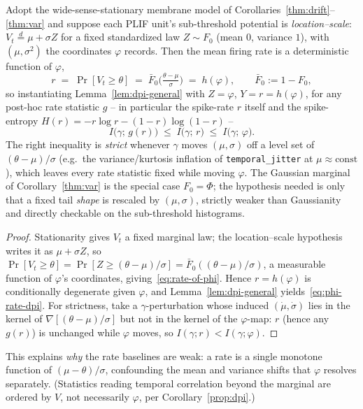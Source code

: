 ﻿\documentclass{article} %
\theoremstyle{remark}
\begin{document}
\begin{corollary}
\label{cor:rate-dpi}
Adopt the wide-sense-stationary membrane model of Corollaries~\ref{thm:drift}--\ref{thm:var} and
suppose each PLIF unit's sub-threshold potential is \emph{location--scale}:
$V_t\overset{d}{=}\mu+\sigma Z$ for a fixed standardized law $Z\sim F_0$ (mean $0$, variance $1$),
with $(\mu,\sigma^2)$ the coordinates $\varphi$ records. Then the mean firing rate is a deterministic
function of $\varphi$,
\begin{equation}
  r \;=\; \Pr[V_t\ge\theta] \;=\; \bar F_0\!\Big(\tfrac{\theta-\mu}{\sigma}\Big)\;=\;h(\varphi),
  \qquad \bar F_0:=1-F_0,
  \label{eq:rate-of-phi}
\end{equation}
so instantiating Lemma~\ref{lem:dpi-general} with $Z=\varphi$, $Y=r=h(\varphi)$, for any post-hoc
rate statistic $g$ -- in particular the spike-rate $r$ itself and the spike-entropy
$H(r)=-r\log r-(1-r)\log(1-r)$ --
\begin{equation}
  I\bigl(\gamma;\,g(r)\bigr)\;\le\;I\bigl(\gamma;\,r\bigr)\;\le\;I\bigl(\gamma;\,\varphi\bigr).
  \label{eq:phi-rate-dpi}
\end{equation}
The right inequality is \emph{strict} whenever $\gamma$ moves $(\mu,\sigma)$ off a level set of
$(\theta-\mu)/\sigma$ (e.g.\ the variance/kurtosis inflation of \texttt{temporal\_jitter} at
$\mu\!\approx\!\text{const}$), which leaves every rate statistic fixed while moving $\varphi$. The
Gaussian marginal of Corollary~\ref{thm:var} is the special case $F_0=\Phi$; the hypothesis needed is
only that a fixed tail \emph{shape} is rescaled by $(\mu,\sigma)$, strictly weaker than Gaussianity
and directly checkable on the sub-threshold histograms.
\end{corollary}
\begin{proof}
Stationarity gives $V_t$ a fixed marginal law; the location--scale hypothesis writes it as
$\mu+\sigma Z$, so $\Pr[V_t\ge\theta]=\Pr[Z\ge(\theta-\mu)/\sigma]=\bar F_0((\theta-\mu)/\sigma)$, a
measurable function of $\varphi$'s coordinates, giving~\eqref{eq:rate-of-phi}. Hence $r=h(\varphi)$
is conditionally degenerate given $\varphi$, and Lemma~\ref{lem:dpi-general}
yields~\eqref{eq:phi-rate-dpi}. For strictness, take a $\gamma$-perturbation whose induced
$(\dot\mu,\dot\sigma)$ lies in the kernel of $\nabla[(\theta-\mu)/\sigma]$ but not in the kernel of
the $\varphi$-map: $r$ (hence any $g(r)$) is unchanged while $\varphi$ moves, so
$I(\gamma;r)<I(\gamma;\varphi)$.
\end{proof}
\noindent This explains \emph{why} the rate baselines are weak: a rate is a single monotone function
of $(\mu-\theta)/\sigma$, confounding the mean and variance shifts that $\varphi$ resolves
separately. (Statistics reading temporal correlation beyond the marginal are ordered by $V$, not
necessarily $\varphi$, per Corollary~\ref{prop:dpi}.)
\end{document}

